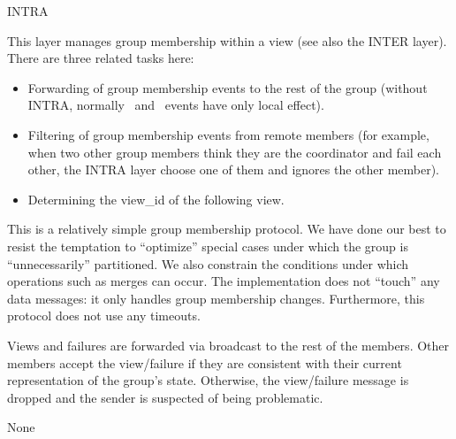 %
%
%
\begin{Layer}{INTRA}

This layer manages group membership within a view (see also the INTER layer).
There are three related tasks here:
\begin{itemize}
\item
Forwarding of group membership events to the rest of the group
(without INTRA, normally \DnView\ and \DnFail\ events have only local
effect).
\item 
Filtering of group membership events from remote members (for
example, when two other group members think they are the coordinator
and fail each other, the INTRA layer choose one of them and ignores
the other member).
\item
Determining the view\_id of the following view.
\end{itemize}

\begin{Protocol}
This is a relatively simple group membership protocol.  We have done our
best to resist the temptation to ``optimize'' special cases under which the
group is ``unnecessarily'' partitioned.  We also constrain the conditions
under which operations such as merges can occur.  The implementation does
not ``touch'' any data messages: it only handles group membership changes.
Furthermore, this protocol does not use any timeouts.

Views and failures are forwarded via broadcast to the rest of the members.
Other members accept the view/failure if they are consistent with their
current representation of the group's state.  Otherwise, the view/failure
message is dropped and the sender is suspected of being problematic. 
\end{Protocol}

\begin{Parameters}
\item None
\end{Parameters}


\end{Layer}
